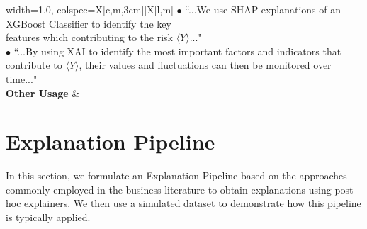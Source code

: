 \documentclass[12pt]{article}  %
\begin{document}
\begin{table}[htbp]
\begin{tblr}{width=1.0\textwidth, colspec={X[c,m,3cm]|X[l,m]}}
{$\bullet$ ``...We use SHAP explanations of an XGBoost Classifier to identify the key \\features which contributing to the risk $\langle Y\rangle$..."\\
$\bullet$ ``...By using XAI to identify the most important factors and indicators that \\contribute to $\langle Y\rangle$, their values and fluctuations can then be monitored over time..."} \\ \hline
  \textbf{Other Usage}
 &  \\
\end{tblr}

\label{tab:metric_examples}
\end{table}



\section{Explanation Pipeline}
    \label{sec:pipeline_demo}
In this section, we formulate an Explanation Pipeline based on the approaches commonly employed in the business literature to obtain explanations using post hoc explainers. We then use a simulated dataset to demonstrate how this pipeline is typically applied.
    
\end{document}
